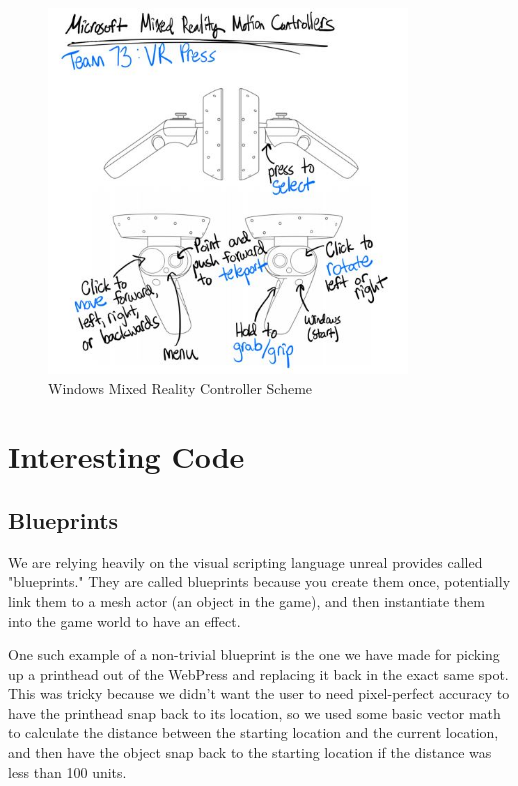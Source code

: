 \documentclass[onecolumn, draftclsnofoot,10pt, compsoc]{IEEEtran}
\begin{document}
\begin{figure}[ht!]
    \centering
    \includegraphics[width=0.85\textwidth]{VRPressInfographic.JPG}
    \caption{Windows Mixed Reality Controller Scheme}
    \label{fig:controllers}
\end{figure}



\newpage
\section{Interesting Code}

\subsection{Blueprints}

We are relying heavily on the visual scripting language unreal provides called "blueprints." They are called blueprints because you create them once, potentially link them to a mesh actor (an object in the game), and then instantiate them into the game world to have an effect.

One such example of a non-trivial blueprint is the one we have made for picking up a printhead out of the WebPress and replacing it back in the exact same spot. This was tricky because we didn't want the user to need pixel-perfect accuracy to have the printhead snap back to its location, so we used some basic vector math to calculate the distance between the starting location and the current location, and then have the object snap back to the starting location if the distance was less than 100 units.
\end{document}
